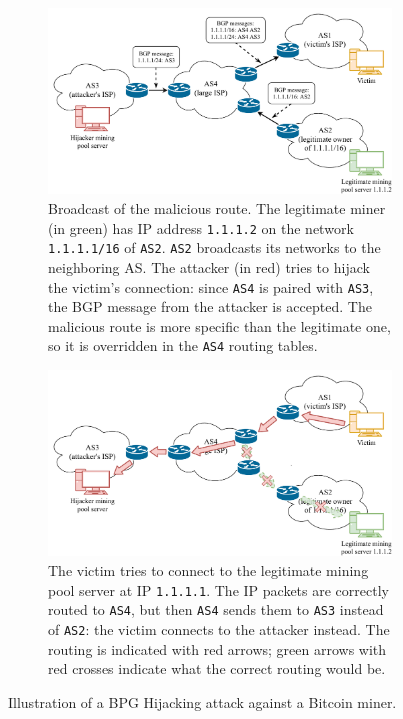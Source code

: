 \begin{figure}[h!]
	\begin{subfigure}{\textwidth}
		\centering
		\vspace*{0.25cm}
		\includegraphics[width=\columnwidth]{figures/bgp_1}
		\vspace*{0.25cm}
		\caption{
			Broadcast of the malicious route.
			The legitimate miner (in green) has IP address \texttt{1.1.1.2} on the network \texttt{1.1.1.1/16} of \texttt{AS2}.
			\texttt{AS2} broadcasts its networks to the neighboring \ac{AS}.
			The attacker (in red) tries to hijack the victim's connection:
			since \texttt{AS4} is paired with \texttt{AS3}, the BGP message from the attacker is accepted.
			The malicious route is more specific than the legitimate one, so it is overridden in the \texttt{AS4} routing tables.
		}
		\vspace*{0.25cm}
	\end{subfigure}
	\begin{subfigure}{\textwidth}
		\centering
		\vspace*{0.25cm}
		\includegraphics[width=\columnwidth]{figures/bgp_2}
		\vspace*{0.25cm}
		\caption{
			The victim tries to connect to the legitimate mining pool server at IP \texttt{1.1.1.1}.
			The IP packets are correctly routed to \texttt{AS4}, but then \texttt{AS4} sends them to \texttt{AS3} instead of \texttt{AS2}:
			the victim connects to the attacker instead.
			The routing is indicated with red arrows;
			green arrows with red crosses indicate what the correct routing would be.
		}
		\vspace*{0.25cm}
	\end{subfigure}
	\caption[Illustration of a BPG Hijacking attack against a Bitcoin miner]{Illustration of a BPG Hijacking attack against a Bitcoin miner.}
	\label{fig:bpg-hijacking}
\end{figure}

